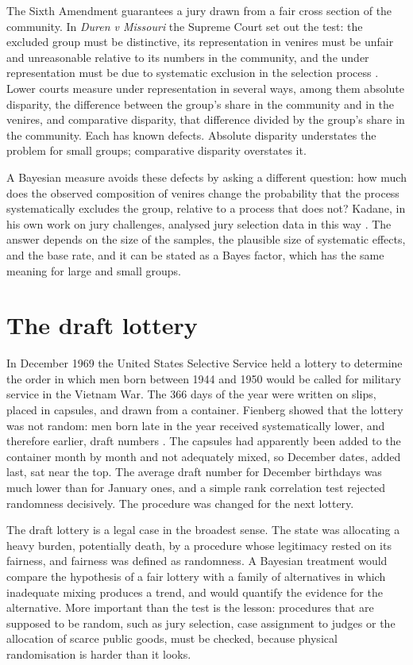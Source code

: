 The Sixth Amendment guarantees a jury drawn from a fair cross section of the community. In \emph{Duren v Missouri} the Supreme Court set out the test: the excluded group must be distinctive, its representation in venires must be unfair and unreasonable relative to its numbers in the community, and the under representation must be due to systematic exclusion in the selection process \citep{duren1979}. Lower courts measure under representation in several ways, among them absolute disparity, the difference between the group's share in the community and in the venires, and comparative disparity, that difference divided by the group's share in the community. Each has known defects. Absolute disparity understates the problem for small groups; comparative disparity overstates it.

A Bayesian measure avoids these defects by asking a different question: how much does the observed composition of venires change the probability that the process systematically excludes the group, relative to a process that does not? Kadane, in his own work on jury challenges, analysed jury selection data in this way \citep{kadane2008}. The answer depends on the size of the samples, the plausible size of systematic effects, and the base rate, and it can be stated as a Bayes factor, which has the same meaning for large and small groups.

\section{The draft lottery}

In December 1969 the United States Selective Service held a lottery to determine the order in which men born between 1944 and 1950 would be called for military service in the Vietnam War. The 366 days of the year were written on slips, placed in capsules, and drawn from a container. Fienberg showed that the lottery was not random: men born late in the year received systematically lower, and therefore earlier, draft numbers \citep{fienberg1971}. The capsules had apparently been added to the container month by month and not adequately mixed, so December dates, added last, sat near the top. The average draft number for December birthdays was much lower than for January ones, and a simple rank correlation test rejected randomness decisively. The procedure was changed for the next lottery.

The draft lottery is a legal case in the broadest sense. The state was allocating a heavy burden, potentially death, by a procedure whose legitimacy rested on its fairness, and fairness was defined as randomness. A Bayesian treatment would compare the hypothesis of a fair lottery with a family of alternatives in which inadequate mixing produces a trend, and would quantify the evidence for the alternative. More important than the test is the lesson: procedures that are supposed to be random, such as jury selection, case assignment to judges or the allocation of scarce public goods, must be checked, because physical randomisation is harder than it looks.

